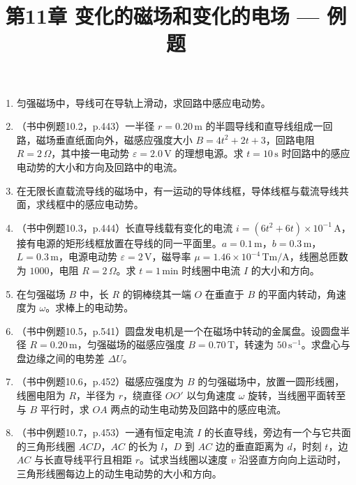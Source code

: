 \documentclass{ctexart}
\title{\textbf{第11章 变化的磁场和变化的电场} --- 例题}
\author{}
\date{}
\begin{document}
\maketitle

\begin{enumerate}

\item 匀强磁场中，导线可在导轨上滑动，求回路中感应电动势。

\item（书中例题10.2，p.443）一半径 $r = 0.20\,\text{m}$ 的半圆导线和直导线组成一回路，磁场垂直纸面向外，磁感应强度大小 $B = 4t^{2} + 2t + 3$，回路电阻 $R = 2\,\Omega$，其中接一电动势 $\varepsilon = 2.0\,\text{V}$ 的理想电源。求 $t = 10\,\text{s}$ 时回路中的感应电动势的大小和方向及回路中的电流。

\item 在无限长直载流导线的磁场中，有一运动的导体线框，导体线框与载流导线共面，求线框中的感应电动势。

\item（书中例题10.3，p.444）长直导线载有变化的电流 $i = (6t^{2} + 6t)\times10^{-1}\,\text{A}$，接有电源的矩形线框放置在导线的同一平面里。$a = 0.1\,\text{m}$，$b = 0.3\,\text{m}$，$L = 0.3\,\text{m}$，电源电动势 $\varepsilon = 2\,\text{V}$，磁导率 $\mu = 1.46\times10^{-4}\,\text{Tm/A}$，线圈总匝数为 $1000$，电阻 $R = 2\,\Omega$。求 $t = 1\,\text{min}$ 时线圈中电流 $I$ 的大小和方向。

\item 在匀强磁场 $B$ 中，长 $R$ 的铜棒绕其一端 $O$ 在垂直于 $B$ 的平面内转动，角速度为 $\omega$。求棒上的电动势。

\item（书中例题10.5，p.541）圆盘发电机是一个在磁场中转动的金属盘。设圆盘半径 $R = 0.20\,\text{m}$，匀强磁场的磁感应强度 $B = 0.70\,\text{T}$，转速为 $50\,\text{s}^{-1}$。求盘心与盘边缘之间的电势差 $\Delta U$。

\item（书中例题10.6，p.452）磁感应强度为 $B$ 的匀强磁场中，放置一圆形线圈，线圈电阻为 $R$，半径为 $r$，绕直径 $OO'$ 以匀角速度 $\omega$ 旋转，当线圈平面转至与 $B$ 平行时，求 $OA$ 两点的动生电动势及回路中的感应电流。

\item（书中例题10.7，p.453）一通有恒定电流 $I$ 的长直导线，旁边有一个与它共面的三角形线圈 $ACD$，$AC$ 的长为 $l$，$D$ 到 $AC$ 边的垂直距离为 $d$，时刻 $t$，边 $AC$ 与长直导线平行且相距 $r$。试求当线圈以速度 $v$ 沿竖直方向向上运动时，三角形线圈每边上的动生电动势的大小和方向。


\end{enumerate}
\end{document}
